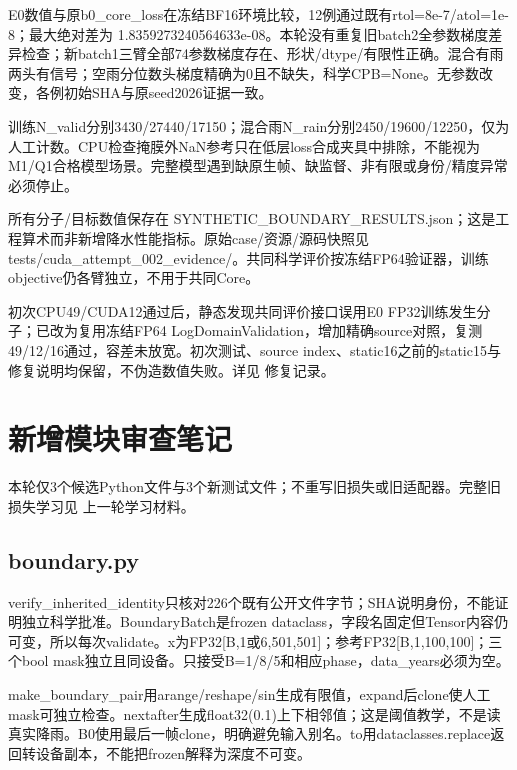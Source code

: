\documentclass[UTF8,fontset=fandol,10pt]{ctexart}
\begin{document}
E0数值与原b0\_\allowbreak{}core\_\allowbreak{}loss在冻结BF16环境比较，12例通过既有rtol=8e-7/\allowbreak{}atol=1e-8；最大绝对差为 1.8359273240564633e-08。本轮没有重复旧batch2全参数梯度差异检查；新batch1三臂全部74参数梯度存在、形状/\allowbreak{}dtype/\allowbreak{}有限性正确。混合有雨两头有信号；空雨分位数头梯度精确为0且不缺失，科学CPB=None。无参数改变，各例初始SHA与原seed2026证据一致。

训练N\_\allowbreak{}valid分别3430/\allowbreak{}27440/\allowbreak{}17150；混合雨N\_\allowbreak{}rain分别2450/\allowbreak{}19600/\allowbreak{}12250，仅为人工计数。CPU检查掩膜外NaN参考只在低层loss合成夹具中排除，不能视为M1/\allowbreak{}Q1合格模型场景。完整模型遇到缺原生帧、缺监督、非有限或身份/\allowbreak{}精度异常必须停止。

所有分子/\allowbreak{}目标数值保存在 SYNTHETIC\_\allowbreak{}BOUNDARY\_\allowbreak{}RESULTS.json；这是工程算术而非新增降水性能指标。原始case/\allowbreak{}资源/\allowbreak{}源码快照见tests/\allowbreak{}cuda\_\allowbreak{}attempt\_\allowbreak{}002\_\allowbreak{}evidence/\allowbreak{}。共同科学评价按冻结FP64验证器，训练objective仍各臂独立，不用于共同Core。

初次CPU49/\allowbreak{}CUDA12通过后，静态发现共同评价接口误用E0 FP32训练发生分子；已改为复用冻结FP64 LogDomainValidation，增加精确source对照，复测49/\allowbreak{}12/\allowbreak{}16通过，容差未放宽。初次测试、source index、static16之前的static15与修复说明均保留，不伪造数值失败。详见 修复记录。
\clearpage\section{新增模块审查笔记}

本轮仅3个候选Python文件与3个新测试文件；不重写旧损失或旧适配器。完整旧损失学习见 上一轮学习材料。

\subsection{boundary.py}

verify\_\allowbreak{}inherited\_\allowbreak{}identity只核对226个既有公开文件字节；SHA说明身份，不能证明独立科学批准。BoundaryBatch是frozen dataclass，字段名固定但Tensor内容仍可变，所以每次validate。x为FP32[B,1或6,501,501]；参考FP32[B,1,100,100]；三个bool mask独立且同设备。只接受B=1/\allowbreak{}8/\allowbreak{}5和相应phase，data\_\allowbreak{}years必须为空。

make\_\allowbreak{}boundary\_\allowbreak{}pair用arange/\allowbreak{}reshape/\allowbreak{}sin生成有限值，expand后clone使人工mask可独立检查。nextafter生成float32(0.1)上下相邻值；这是阈值教学，不是读真实降雨。B0使用最后一帧clone，明确避免输入别名。to用dataclasses.replace返回转设备副本，不能把frozen解释为深度不可变。
\end{document}
